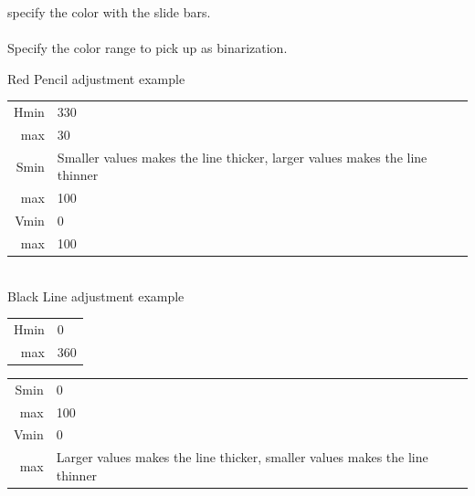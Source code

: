 \documentclass[a4paper,10pt]{article}
\begin{document}
\noindent specify the color with the slide bars.\\
\\
Specify the color range to pick up as binarization.\par
Red Pencil adjustment example\\[-1.25em]

\setlength{\tabcolsep}{0em}
\renewcommand{\arraystretch}{1.0}
\hspace{4.0em}\begin{tabular}{rl}
Hmin \hspace{1.0em}  & 330\\
max \hspace{1.0em} & 30\\
Smin \hspace{1.0em} & Smaller values makes the line thicker, larger values makes the line thinner\\
max \hspace{1.0em} & 100\\
Vmin \hspace{1.0em} & 0\\
max \hspace{1.0em} & 100\\
\end{tabular}\\[-0.5em]

Black Line adjustment example\\[-1.25em]

\setlength{\tabcolsep}{0em}
\renewcommand{\arraystretch}{1.0}
\hspace{4.0em}\begin{tabular}{rl}
Hmin \hspace{1.0em} & 0\\
max \hspace{1.0em} & 360\\
\end{tabular}

\newpage

\setlength{\tabcolsep}{0em}
\renewcommand{\arraystretch}{1.0}
\hspace{4.0em}\begin{tabular}{rl}
Smin \hspace{1.0em} & 0\\
max \hspace{1.0em} & 100\\
Vmin \hspace{1.0em} & 0\\
max \hspace{1.0em} & Larger values makes the line thicker, smaller values makes the line thinner\\
\end{tabular}\\[-0.5em]
\end{document}
